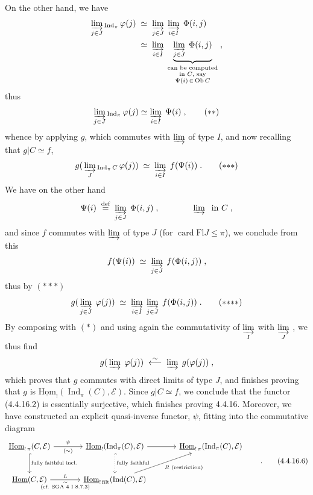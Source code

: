 \documentclass[11pt]{article}
\newcommand{\msp}[1]{\marginpar{\footnotesize [#1]}}
\newcommand{\Ind}{\operatorname{Ind}}
\newcommand{\uHom}{\underline{\mathrm{Hom}}}
\newcommand{\Ob}{\operatorname{Ob}}
\newcommand{\card}{\operatorname{card}}
\newcommand{\Fl}{\mathrm{Fl}}
\begin{document}
On the other hand, we have
\[
\begin{aligned}
\varinjlim_{j\in J}{}_{\Ind_\pi}\,\varphi(j)\;&\simeq\;\varinjlim_{j\in J}\;\varinjlim_{i\in I}\;\Phi(i,j)\\
&\simeq\;\varinjlim_{i\in I}\;\underbrace{\varinjlim_{j\in J}\;\Phi(i,j)}_{\substack{\text{can be computed}\\ \text{in $C$, say}\\ \Psi(i)\,\in\,\Ob C}}\;,
\end{aligned}
\]
thus
\[
\varinjlim_{j\in J}{}_{\Ind_\pi}\,\varphi(j)\simeq\varinjlim_{i\in I}\;\Psi(i)\;, \tag*{$(**)$}
\]
\msp{page 105}
whence by applying $g$, which commutes with $\varinjlim$ of type $I$, and now recalling that $g|C\simeq f$,
\[
g(\,\varinjlim_{J}{}_{\Ind_\pi C}\,\varphi(j))\;\simeq\;\varinjlim_{i\in I}\;f(\Psi(i))\;. \tag*{$(*{*}*)$}
\]
We have on the other hand
\[
\Psi(i)\;\overset{\text{def}}{=}\;\varinjlim_{j\in J}\;\Phi(i,j)\;,\qquad\qquad \varinjlim\;\text{ in } C\;,
\]
and since $f$ commutes with $\varinjlim$ of type $J$ (for $\card\Fl J\leqslant\pi$), we conclude from this
\[
f(\Psi(i))\;\simeq\;\varinjlim_{j\in J}\;f(\Phi(i,j))\;,
\]
thus by $(*{*}*)$
\[
g(\,\varinjlim_{j\in J}\;\varphi(j))\;\simeq\;\varinjlim_{i\in I}\;\varinjlim_{j\in J}\;f(\Phi(i,j))\;. \tag*{$(*{*}{*}*)$}
\]
By composing with $(*)$ and using again the commutativity of $\varinjlim\limits_{I}$ with $\varinjlim\limits_{J}$ , we thus find
\[
g(\,\varinjlim\;\varphi(j))\;\overset{\sim}{\longleftarrow}\;\varinjlim\;g(\varphi(j))\;,
\]
which proves that $g$ commutes with direct limits of type $J$, and finishes proving that $g$ is $\uHom_{!}(\Ind_\pi(C),\mathcal{E})$. Since $g|C\simeq f$, we conclude that the functor (4.4.16.2) is essentially surjective, which finishes proving 4.4.16. Moreover, we have constructed an explicit quasi-inverse functor, $\psi$,
\msp{page 106}
fitting into the commutative diagram
\[
\begin{tikzcd}[column sep=large, row sep=large]
\uHom_{!\,\pi}(C,\mathcal{E}) \arrow[r, "\psi", "(\sim)"'] \arrow[d, hook, "\text{fully faithful incl.}"] & \uHom_{!}(\Ind_\pi(C),\mathcal{E}) \arrow[r] \arrow[d, hook, dotted, "\text{fully faithful}"] & \uHom_{!\,\pi}(\Ind_\pi(C),\mathcal{E}) \\
\uHom(C,\mathcal{E}) \arrow[r, "L", "\substack{\sim\\ \text{(cf. SGA 4 I 8.7.3)}}"'] & \uHom_{!\,\mathrm{filt}}(\Ind(C),\mathcal{E}) \arrow[ur, "R\ \text{(restriction)}"'] &
\end{tikzcd}
\qquad.
\tag*{(4.4.16.6)} %
\]
\end{document}
